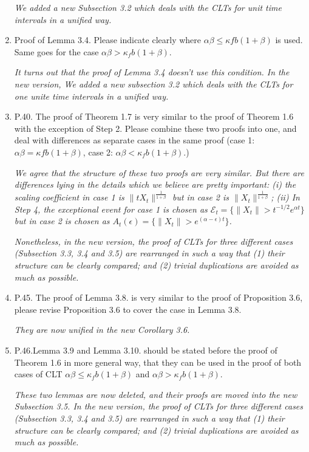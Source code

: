 \documentclass[12pt,a4paper]{amsart}
\begin{document}
\begin{enumerate}
  \emph{We added a new Subsection 3.2 which deals with the CLTs for unit time intervals in a unified way.}
\item
  Proof of Lemma 3.4. Please indicate clearly where $\alpha \beta \leq \kappa f b(1 + \beta)$ is used.
  Same goes for the case $\alpha \beta > \kappa_f b(1 + \beta)$.

  \emph{It turns out that the proof of Lemma 3.4 doesn't use this condition. In the new version, We added a new subsection 3.2 which deals with the CLTs for one unite time intervals in a unified way.}

\item
  P.40.
  The proof of Theorem 1.7 is very similar to the proof of Theorem 1.6 with the exception of Step 2.
  Please combine these two proofs into one, and deal with differences as separate cases in the same proof (case 1: $\alpha \beta = \kappa f b(1 + \beta)$, case 2: $\alpha \beta < \kappa_f b(1 + \beta)$.)

  \emph{We agree that the structure of these two proofs are very similar. But there are
differences lying in the details which we believe are pretty important:
(i) the scaling coefficient in case 1 is $\|tX_t\|^{\frac{1}{1+\beta}}$ but in case 2 is $\|X_t\|^{\frac{1}{1+\beta}}$;
 (ii) In Step 4, the exceptional event for case 1 is chosen as $\mathcal E_t = \{\|X_t\| > t^{-1/2} e^{\alpha t}\}$ but in case 2 is chosen as $ A_t(\epsilon) = \{\|X_t\|> e^{(\alpha - \epsilon )t}\}$. }

\emph{
    Nonetheless, in the new version, the proof of CLTs for three different cases (Subsection 3.3, 3.4 and 3.5) are rearranged in such a way that (1) their structure can be clearly compared; and (2) trivial duplications are avoided as much as possible.
}

\item
  P.45.
  The proof of Lemma 3.8. is very similar to the proof of Proposition 3.6, please revise Proposition 3.6 to cover the case in Lemma 3.8.

  \emph{They are now unified in the new Corollary 3.6.}

\item
  P.46.Lemma 3.9 and Lemma 3.10. should be stated before the proof of Theorem 1.6 in more general way, that they can be used in the proof of both cases of CLT $\alpha \beta \leq \kappa_f b(1 + \beta)$ and $\alpha \beta > \kappa_f b(1 + \beta).$

  \emph{These two lemmas are now deleted, and their proofs are moved into the new Subsection 3.5.
In the new version, the proof of CLTs for three different cases (Subsection 3.3, 3.4 and 3.5) are rearranged in such a way that (1) their structure can be clearly compared; and (2) trivial duplications are avoided as much as possible.}
\end{enumerate}
\end{document}
